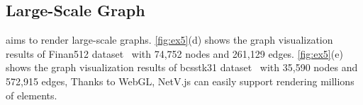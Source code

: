 
\subsection{Large-Scale Graph}
\name aims to render large-scale graphs. \autoref{fig:ex5}(d) shows the graph visualization results of Finan512 dataset~\cite{davis2011university} with 74,752 nodes and 261,129 edges. \autoref{fig:ex5}(e) shows the graph visualization results of bcsstk31 dataset~\cite{davis2011university} with 35,590 nodes and 572,915 edges,  Thanks to WebGL, NetV.js can easily support rendering millions of elements.




